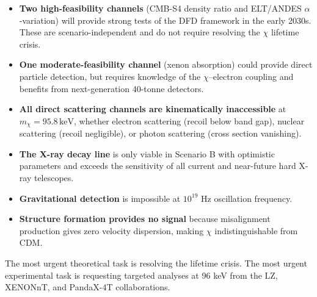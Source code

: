 \documentclass[12pt,a4paper]{article}
\newcommand{\keV}{\,\mathrm{keV}}
\begin{document}
\begin{itemize}
\item \textbf{Two high-feasibility channels} (CMB-S4 density ratio
and ELT/ANDES $\alpha$-variation) will provide strong tests of the
DFD framework in the early 2030s. These are scenario-independent
and do not require resolving the $\chi$ lifetime crisis.

\item \textbf{One moderate-feasibility channel} (xenon absorption)
could provide direct particle detection, but requires knowledge of
the $\chi$--electron coupling and benefits from next-generation
40-tonne detectors.

\item \textbf{All direct scattering channels are kinematically
inaccessible} at $m_\chi = 95.8\keV$, whether electron scattering
(recoil below band gap), nuclear scattering (recoil negligible),
or photon scattering (cross section vanishing).

\item \textbf{The X-ray decay line} is only viable in Scenario B
with optimistic parameters and exceeds the sensitivity of all
current and near-future hard X-ray telescopes.

\item \textbf{Gravitational detection} is impossible at $10^{19}$ Hz
oscillation frequency.

\item \textbf{Structure formation provides no signal} because
misalignment production gives zero velocity dispersion, making
$\chi$ indistinguishable from CDM.
\end{itemize}

The most urgent theoretical task is resolving the lifetime crisis.
The most urgent experimental task is requesting targeted analyses
at 96 keV from the LZ, XENONnT, and PandaX-4T collaborations.
\end{document}
